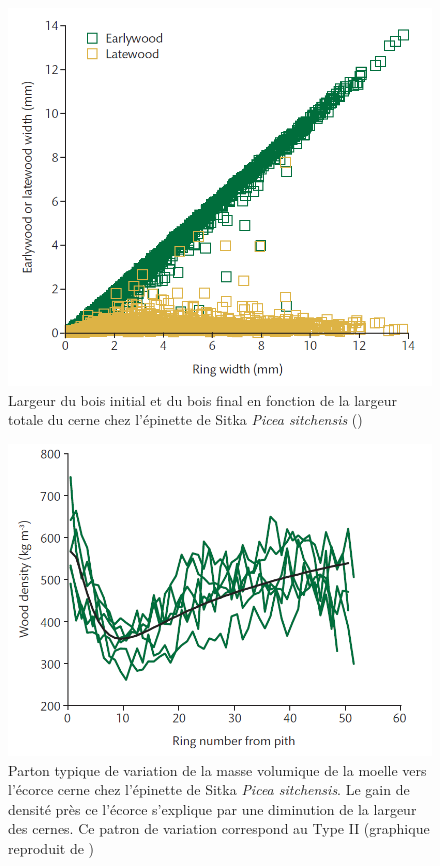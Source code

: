 \begin{figure}[h]
	\centering
	\includegraphics[scale=0.4]{img/ch7_larg_moelle}
	\caption{Largeur du bois initial et du bois final en fonction de la largeur totale du cerne chez l'épinette de Sitka \textit{Picea sitchensis} (\cite{moore2011wood})}
	\label{fig:larg_moelle}
\end{figure}

\begin{figure}[h]
	\centering
	\includegraphics[scale=0.5]{img/ch7_densite_moelle}
	\caption{Parton typique de variation de la masse volumique de la moelle vers l'écorce cerne chez l'épinette de Sitka \textit{Picea sitchensis}. Le gain de densité près ce l'écorce s'explique par une diminution de la largeur des cernes. Ce patron de variation correspond au Type II (graphique reproduit de \cite{moore2011wood})}
	\label{fig:densite_moelle}
\end{figure}

